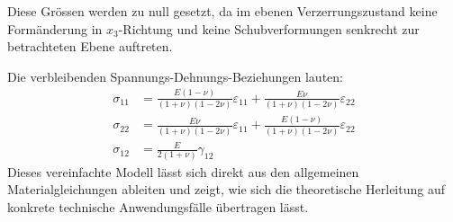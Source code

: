 Diese Grössen werden zu null gesetzt, da im ebenen Verzerrungszustand keine Formänderung in $x_3$-Richtung und keine Schubverformungen senkrecht zur betrachteten Ebene auftreten.

Die verbleibenden Spannungs-Dehnungs-Beziehungen lauten:
\begin{align}
	\sigma_{11} &=	\frac{E (1-\nu)}{(1+\nu)(1-2\nu)} \varepsilon_{11} + \frac{E \nu}{(1+\nu)(1-2\nu)} \varepsilon_{22}
	\\
	\sigma_{22} &=	\frac{E \nu}{(1+\nu)(1-2\nu)} \varepsilon_{11} + \frac{E (1-\nu)}{(1+\nu)(1-2\nu)} \varepsilon_{22}
	\\
	\sigma_{12} &=	\frac{E}{2(1+\nu)} \gamma_{12}
\end{align}
Dieses vereinfachte Modell lässt sich direkt aus den allgemeinen Materialgleichungen ableiten und zeigt, wie sich die theoretische Herleitung auf konkrete technische Anwendungsfälle übertragen lässt.
